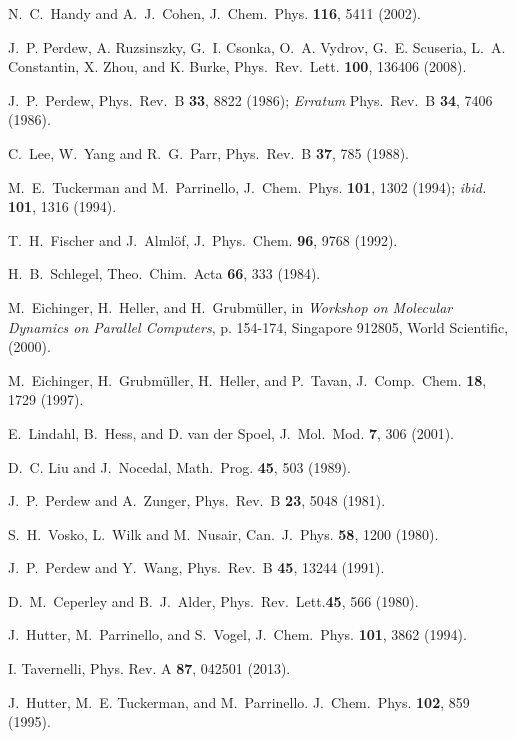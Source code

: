 \documentclass[twoside,10pt,titlepage,a4paper]{article}
\begin{document}
\begin{thebibliography}{999}
    N.~C.~Handy and A.~J.~Cohen, 
    J.~Chem.~Phys. {\bf 116}, 5411 (2002).

    J.~P. Perdew, A. Ruzsinszky, G.~I. Csonka, O.~A. Vydrov, G.~E. Scuseria,
    L.~A. Constantin, X. Zhou, and K. Burke,
    Phys.~Rev.~Lett. {\bf 100}, 136406 (2008).

    J.~P.~Perdew,
    Phys.~Rev.~B {\bf 33}, 8822 (1986);
    {\it Erratum} Phys.~Rev.~B {\bf 34}, 7406 (1986).

    C.~Lee, W.~Yang and R.~G.~Parr,
    Phys.~Rev.~B {\bf 37}, 785 (1988).

    M.~E.~Tuckerman and M.~Parrinello, J.~Chem.~Phys.
    {\bf 101}, 1302 (1994); {\it ibid.} {\bf 101}, 1316 (1994).

    T.~H.~Fischer and J.~Alml\"of,
    J.~Phys.~Chem. {\bf 96}, 9768 (1992).

    H.~B.~Schlegel, Theo.~Chim.~Acta {\bf 66}, 333 (1984).

 M.~Eichinger, H.~Heller, and H.~Grubm\"uller,
   in
   {\em Workshop on Molecular Dynamics on Parallel Computers},
   p. 154-174, Singapore 912805, World Scientific, (2000).

 M.~Eichinger, H.~Grubm\"uller, H.~Heller, and P.~Tavan,
    J.~Comp.~Chem. {\bf 18}, 1729 (1997).

    E.~Lindahl, B.~Hess, and D. van der Spoel,
    J.~Mol.~Mod. {\bf 7}, 306 (2001).

    D.~C. Liu and J.~Nocedal,
    Math.~Prog. {\bf 45}, 503 (1989).

    J.~P.~Perdew and A.~Zunger,
    Phys.~Rev.~B {\bf 23}, 5048 (1981).

    S.~H.~Vosko, L.~Wilk and M.~Nusair,
    Can.~J.~Phys. {\bf 58}, 1200 (1980).

    J.~P.~Perdew and Y.~Wang, 
    Phys.~Rev.~B {\bf 45}, 13244 (1991).

    D.~M.~Ceperley and B.~J.~Alder,
    Phys.~Rev.~Lett.{\bf 45}, 566 (1980).

    J.~Hutter, M.~Parrinello, and S.~Vogel,
    J.~Chem.~Phys. {\bf 101}, 3862 (1994).

    I. Tavernelli,
    Phys. Rev. A {\bf 87}, 042501 (2013).

    J.~Hutter, M.~E. Tuckerman, and M.~Parrinello.
    J.~Chem.~Phys. {\bf 102}, 859 (1995).


\end{thebibliography}
\end{document}
